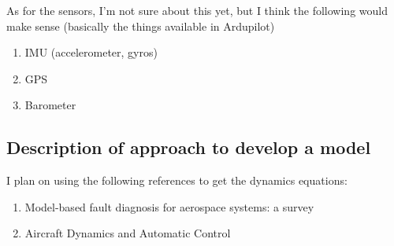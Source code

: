 As for the sensors, I'm not sure about this yet, but I think the following would make
sense (basically the things available in Ardupilot)

\begin{enumerate}
\item IMU (accelerometer, gyros)
\item GPS
\item Barometer
\end{enumerate}

\subsection{Description of approach to develop a model}

I plan on using the following references to get the dynamics equations:

\begin{enumerate}
  \item Model-based fault diagnosis for aerospace systems: a survey
    \cite{marzat_model-based_2012}
  \item Aircraft Dynamics and Automatic Control \cite{mcruer2014aircraft}
\end{enumerate}
  
